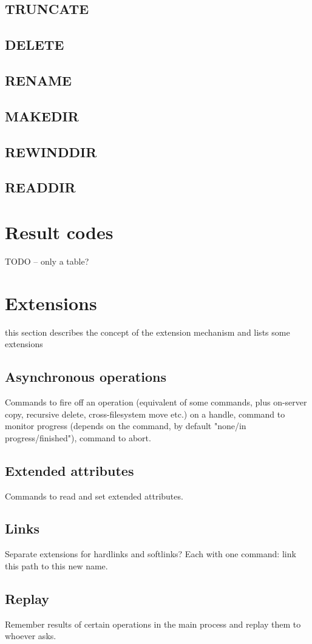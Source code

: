 \subsection{TRUNCATE}

\subsection{DELETE}

\subsection{RENAME}

\subsection{MAKEDIR}

\subsection{REWINDDIR}

\subsection{READDIR}



\section{Result codes}

TODO -- only a table?


\section{Extensions}

this section describes the concept of the extension mechanism and lists some extensions

\subsection{Asynchronous operations}

Commands to fire off an operation (equivalent of some commands, plus on-server copy, recursive delete,
cross-filesystem move etc.) on a handle, command to monitor progress (depends on the command, by default
"none/in progress/finished"), command to abort.

\subsection{Extended attributes}

Commands to read and set extended attributes.

\subsection{Links}

Separate extensions for hardlinks and softlinks? Each with one command: link this path to this new name.

\subsection{Replay}

Remember results of certain operations in the main process and replay them to whoever asks.
